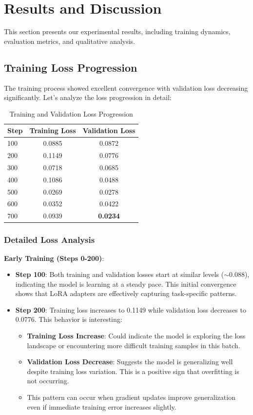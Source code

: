 \documentclass[conference]{IEEEtran}
\begin{document}
\section{Results and Discussion}

This section presents our experimental results, including training dynamics, evaluation metrics, and qualitative analysis.

\subsection{Training Loss Progression}

The training process showed excellent convergence with validation loss decreasing significantly. Let's analyze the loss progression in detail:

\begin{table}[t]
\centering
\caption{Training and Validation Loss Progression}
\begin{tabular}{l|c|c}
\toprule
Step & Training Loss & Validation Loss \\
\midrule
100 & 0.0885 & 0.0872 \\
200 & 0.1149 & 0.0776 \\
300 & 0.0718 & 0.0685 \\
400 & 0.1086 & 0.0488 \\
500 & 0.0269 & 0.0278 \\
600 & 0.0352 & 0.0422 \\
700 & 0.0939 & \textbf{0.0234} \\
\bottomrule
\end{tabular}
\end{table}

\subsubsection{Detailed Loss Analysis}

\textbf{Early Training (Steps 0-200)}:
\begin{itemize}
    \item \textbf{Step 100}: Both training and validation losses start at similar levels ($\sim$0.088), indicating the model is learning at a steady pace. This initial convergence shows that LoRA adapters are effectively capturing task-specific patterns.
    
    \item \textbf{Step 200}: Training loss increases to 0.1149 while validation loss decreases to 0.0776. This behavior is interesting:
    \begin{itemize}
        \item \textbf{Training Loss Increase}: Could indicate the model is exploring the loss landscape or encountering more difficult training samples in this batch.
        \item \textbf{Validation Loss Decrease}: Suggests the model is generalizing well despite training loss variation. This is a positive sign that overfitting is not occurring.
        \item This pattern can occur when gradient updates improve generalization even if immediate training error increases slightly.
    \end{itemize}
\end{itemize}
\end{document}
